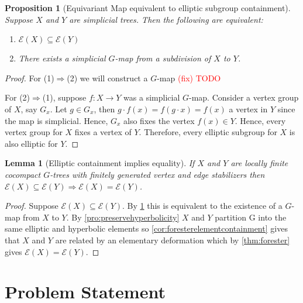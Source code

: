 \documentclass{article}
\newcommand{\fix}[1]{\textcolor{red}{(fix) #1}}
\theoremstyle{mystyle}
\newtheorem{lem}[thm]{Lemma}
\newtheorem{pro}[thm]{Proposition}
\theoremstyle{remark}
\begin{document}
\begin{pro}
[Equivariant Map equivalent to elliptic subgroup containment]
\label{pro:gmapfromsubset}
Suppose $X$ and $Y$ are simplicial trees. Then the following are equivalent:
\begin{enumerate}
    \item \(\mathcal{E}(X) \subseteq \mathcal{E}(Y)\)
    \item There exists a simplicial $G$-map from a subdivision of $X$ to $Y$.
\end{enumerate}
\end{pro}
\begin{proof}
    For (1)$\Rightarrow$(2) we will construct a $G$-map \fix{TODO}
    
    For (2)$\Rightarrow$(1), suppose $f:X\to Y$ was a simplicial $G$-map. Consider a vertex group of $X$, say $G_x$. Let $g\in G_x$, then $g\cdot f(x)=f(g\cdot x)=f(x)$ a vertex in $Y$ since the map is simplicial. Hence, $G_x$ also fixes the vertex $f(x)\in Y$. Hence, every vertex group for $X$ fixes a vertex of $Y$. Therefore, every elliptic subgroup for $X$ is also elliptic for $Y$.
\end{proof}

\begin{lem}
    [Elliptic containment implies equality]
    \label{thm:ellipticimpliesequality} 
    If \(X\) and \(Y\) are locally finite cocompact \(G\)-trees with finitely generated vertex and edge stabilizers then \(\mathcal{E}(X) \subseteq \mathcal{E}(Y) \Longrightarrow \mathcal{E}(X) = \mathcal{E}(Y) \). 
\end{lem}
\begin{proof}
        Suppose \(\mathcal{E}(X) \subseteq \mathcal{E}(Y)\). By \ref{pro:gmapfromsubset} this is equivalent to the existence of a $G$-map from $X$ to $Y$. By \ref{pro:preservehyperbolicity} $X$ and $Y$ partition G into the same elliptic and hyperbolic elements so \ref{cor:foresterelementcontainment} gives that $X$ and $Y$ are related by an elementary deformation which by \ref{thm:forester} gives \(\mathcal{E}(X)=\mathcal{E}(Y)\).
        
        
\end{proof}

\section{Problem Statement}
\end{document}
